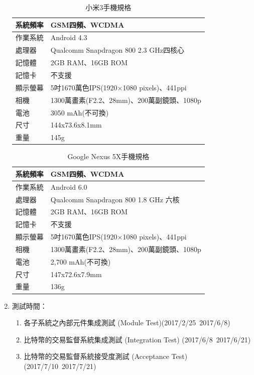 \begin{enumerate}
	 				\begin{table}[!htbp]
					\centering
					\caption{小米3手機規格}
					\label{mi}
					\begin{tabular}{|l|l|}
					\hline
					系統頻率 & GSM四頻、WCDMA \\ \hline
					作業系統 & Android 4.3 \\ \hline
					處理器 & Qualcomm Snapdragon 800 2.3 GHz四核心 \\ \hline
					記憶體 & 2GB RAM、16GB ROM \\ \hline
					記憶卡 & 不支援 \\ \hline
					顯示螢幕 & 5吋1670萬色IPS(1920×1080 pixels)、441ppi \\ \hline
					相機 & 1300萬畫素(F2.2、28mm)、200萬副鏡頭、1080p \\ \hline
					電池 & 3050 mAh(不可換) \\ \hline
					尺寸 & 144x73.6x8.1mm \\ \hline
					重量 & 145g \\ \hline
					\end{tabular}
					\end{table}

					\begin{table}[!htbp]
					\centering
					\caption{Google Nexus 5X手機規格}
					\label{5x}
					\begin{tabular}{|l|l|}
					\hline
					系統頻率 & GSM四頻、WCDMA \\ \hline
					作業系統 & Android 6.0 \\ \hline
					處理器 & Qualcomm Snapdragon 800 1.8 GHz 六核 \\ \hline
					記憶體 & 2GB RAM、16GB ROM \\ \hline
					記憶卡 & 不支援 \\ \hline
					顯示螢幕 & 5吋1670萬色IPS(1920×1080 pixels)、441ppi \\ \hline
					相機 & 1300萬畫素(F2.2、28mm)、200萬副鏡頭、1080p \\ \hline
					電池 & 2,700 mAh(不可換) \\ \hline
					尺寸 & 147x72.6x7.9mm \\ \hline
					重量 & 136g \\ \hline
					\end{tabular}
					\end{table}

	 		\item 測試時間：

	 			\begin{enumerate}
	 				\item 各子系統之內部元件集成測試 (Module Test)(2017/2/25~2017/6/8)
	 				\item 比特幣的交易監督系統集成測試 (Integration Test) (2017/6/8~2017/6/21)
	 				\item 比特幣的交易監督系統接受度測試 (Acceptance Test) (2017/7/10~2017/7/21)
				\end{enumerate}


\end{enumerate}
